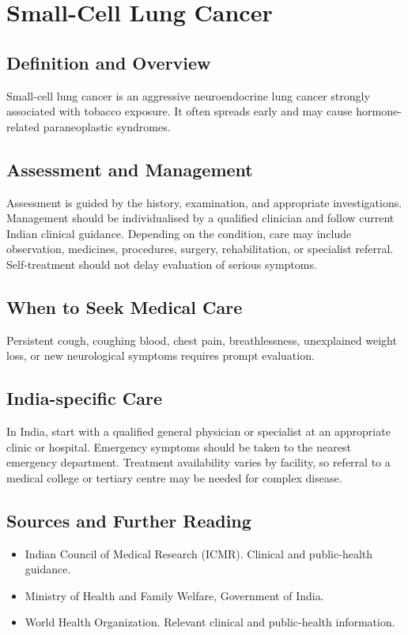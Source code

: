 \chapter{Small-Cell Lung Cancer}

\section*{Definition and Overview}
Small-cell lung cancer is an aggressive neuroendocrine lung cancer strongly associated with tobacco exposure. It often spreads early and may cause hormone-related paraneoplastic syndromes.

\section*{Assessment and Management}
Assessment is guided by the history, examination, and appropriate investigations. Management should be individualised by a qualified clinician and follow current Indian clinical guidance. Depending on the condition, care may include observation, medicines, procedures, surgery, rehabilitation, or specialist referral. Self-treatment should not delay evaluation of serious symptoms.

\section*{When to Seek Medical Care}
Persistent cough, coughing blood, chest pain, breathlessness, unexplained weight loss, or new neurological symptoms requires prompt evaluation.

\section*{India-specific Care}
In India, start with a qualified general physician or specialist at an appropriate clinic or hospital. Emergency symptoms should be taken to the nearest emergency department. Treatment availability varies by facility, so referral to a medical college or tertiary centre may be needed for complex disease.

\section*{Sources and Further Reading}
\begin{itemize}
    \item Indian Council of Medical Research (ICMR). Clinical and public-health guidance.
    \item Ministry of Health and Family Welfare, Government of India.
    \item World Health Organization. Relevant clinical and public-health information.
\end{itemize}

